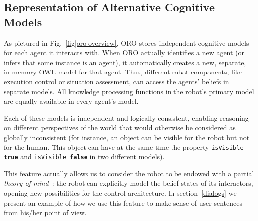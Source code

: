 \documentclass{svmult}
\newcommand{\concept}[1]{{\footnotesize \texttt{#1}}}
\newcommand{\eg}{e.g.\xspace}
\begin{document}
\subsection{Representation of Alternative Cognitive Models}
\label{alterite}

As pictured in Fig.~\ref{fig|oro-overview}, ORO stores independent cognitive
models for each agent it interacts with. When ORO actually identifies a new
agent (or infers that some instance is an agent), it automatically creates a
new, separate, in-memory OWL model for that agent. Thus, different robot
components, like execution control or situation assessment, can access the
agents' beliefs in separate models. All knowledge processing functions in the
robot's primary model are equally available in every agent's model.

Each of these models is independent and logically consistent,
enabling reasoning on different perspectives of the world that would otherwise
be considered as globally inconsistent (for instance, an object can be visible for the
robot but not for the human. This object can have at the same time the property
\concept{isVisible \textbf{true}} and \concept{isVisible \textbf{false}} in
two different models). 

This feature actually allows us to consider the robot to be endowed with a partial
\emph{theory of mind}~\cite{Leslie2000}: the robot can explicitly model
the belief states of its interactors, opening new possibilities for the control
architecture. In section~\ref{dialogs} we present an example of how we use this feature to
make sense of user sentences from his/her point of view.

% 
% 
\end{document}
